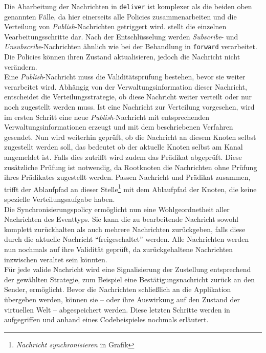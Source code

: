 Die Abarbeitung der Nachrichten in \texttt{deliver} ist komplexer als die beiden oben genannten Fälle, da hier einerseits alle Policies zusammenarbeiten und die Verteilung von \emph{Publish}-Nachrichten getriggert wird.  stellt die einzelnen Vearbeitungsschritte dar. Nach der Entschlüsselung werden \emph{Subscribe}- und \emph{Unsubscribe}-Nachrichten ähnlich wie bei der Behandlung in \texttt{forward} verarbeitet. Die Policies können ihren Zustand aktualisieren, jedoch die Nachricht nicht verändern.\\
Eine \emph{Publish}-Nachricht muss die Validitätsprüfung bestehen, bevor sie weiter verarbeitet wird. Abhängig von der Verwaltungsinformation dieser Nachricht, entscheidet die Verteilungsstrategie, ob diese Nachricht weiter verteilt oder nur noch zugestellt werden muss. Ist eine Nachricht zur Verteilung vorgesehen, wird im ersten Schritt eine neue \emph{Publish}-Nachricht mit entsprechenden Verwaltungsinformationen erzeugt und mit dem beschriebenen Verfahren gesendet. Nun wird weiterhin geprüft, ob die Nachricht an diesem Knoten selbst zugestellt werden soll, das bedeutet ob der aktuelle Knoten selbst am Kanal angemeldet ist. Falls dies zutrifft wird zudem das Prädikat abgeprüft. Diese zusätzliche Prüfung ist notwendig, da Rootknoten die Nachrichten ohne Prüfung ihres Prädikates zugestellt werden. Passen Nachricht und Prädikat zusammen, trifft der Ablaufpfad an dieser Stelle\footnote{\emph{Nachricht synchronisieren} in Grafik } mit dem Ablaufpfad der Knoten, die keine spezielle Verteilungsaufgabe haben.\\
Die Synchronisierungspolicy ermöglicht nun eine Wohlgeordnetheit aller Nachrichten des Eventtyps. Sie kann die zu bearbeitende Nachricht sowohl komplett zurückhalten als auch mehrere Nachrichten zurückgeben, falls diese durch die aktuelle Nachricht \enquote{freigeschaltet} werden. Alle Nachrichten werden nun nochmals auf ihre Validität geprüft, da zurückgehaltene Nachrichten inzwischen veraltet sein könnten.\\
Für jede valide Nachricht wird eine Signalisierung der Zustellung entsprechend der gewählten Strategie, zum Beispiel eine Bestätigungsnachricht zurück an den Sender, ermöglicht. Bevor die Nachrichten schließlich an die Applikation übergeben werden, können sie -- oder ihre Auswirkung auf den Zustand der virtuellen Welt -- abgespeichert werden. Diese letzten Schritte werden in  aufgegriffen und anhand eines Codebeispieles nochmals erläutert.



